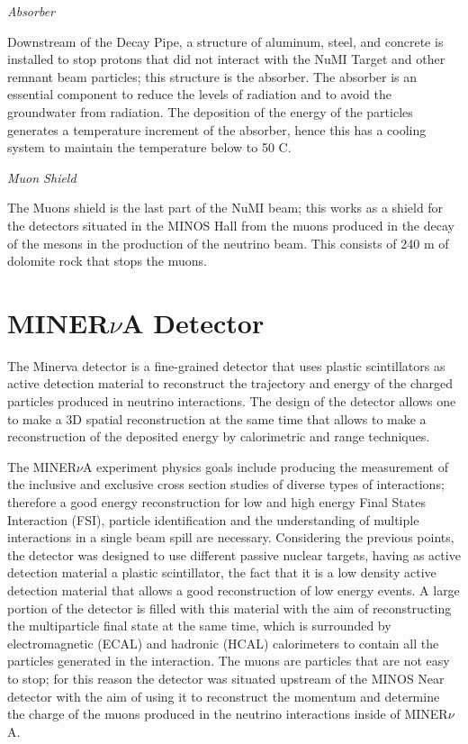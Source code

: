 \textit{Absorber}

Downstream of the Decay Pipe, a structure of aluminum, steel, and concrete is installed to stop protons that did not interact with the NuMI Target and other remnant beam particles; this structure is the absorber. The absorber is an essential component to reduce the levels of radiation and to avoid the groundwater from radiation. The deposition of the energy of the particles generates a temperature increment of the absorber, hence this has a cooling system to maintain the temperature below to 50 C. 

\textit{Muon Shield} 

The Muons shield is the last part of the NuMI beam; this works as a shield for the detectors situated in the MINOS Hall from the muons produced in the decay of the mesons in the production of the neutrino beam. This consists of 240 m of dolomite rock that stops the muons. 

\pagebreak



\section{MINER$\nu$A Detector}
\label{Cap:MnvExp:MnvDetector}

The Minerva detector is a fine-grained detector that uses plastic scintillators as active detection material to reconstruct the trajectory and energy of the charged particles produced in neutrino interactions. The design of the detector allows one to make a 3D spatial reconstruction at the same time that allows to make a reconstruction of the deposited energy by calorimetric and range techniques. 

The MINER$\nu$A experiment physics goals include producing the measurement of the inclusive and exclusive cross section studies of diverse types of interactions; therefore a good energy reconstruction for low and high energy Final States Interaction (FSI), particle identification and the understanding of multiple interactions in a single beam spill are necessary. Considering the previous points, the detector was designed to use different passive nuclear targets, having as active detection material a plastic scintillator, the fact that it is a low density active detection material that allows a good reconstruction of low energy events. A large portion of the detector is filled with this material with the aim of reconstructing the multiparticle final state at the same time, which is surrounded by electromagnetic (ECAL) and hadronic (HCAL) calorimeters to contain all the particles generated in the interaction. The muons are particles that are not easy to stop; for this reason the detector was situated upstream of the MINOS Near detector with the aim of using it to reconstruct the momentum and determine the charge of the muons produced in the neutrino interactions inside of MINER$\nu$A.


